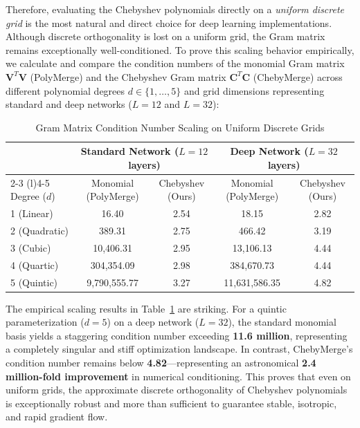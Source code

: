 \documentclass{article}
\theoremstyle{plain}
\theoremstyle{definition}
\theoremstyle{remark}
\begin{document}
Therefore, evaluating the Chebyshev polynomials directly on a \emph{uniform discrete grid} is the most natural and direct choice for deep learning implementations. Although discrete orthogonality is lost on a uniform grid, the Gram matrix remains exceptionally well-conditioned. To prove this scaling behavior empirically, we calculate and compare the condition numbers of the monomial Gram matrix $\mathbf{V}^T \mathbf{V}$ (PolyMerge) and the Chebyshev Gram matrix $\mathbf{C}^T \mathbf{C}$ (ChebyMerge) across different polynomial degrees $d \in \{1, \dots, 5\}$ and grid dimensions representing standard and deep networks ($L=12$ and $L=32$):

\begin{table}[h]
\caption{Gram Matrix Condition Number Scaling on Uniform Discrete Grids}
\label{tab:grid_scaling}
\vskip 0.15in
\begin{center}
\begin{small}
\begin{tabular}{lcccc}
\toprule
& \multicolumn{2}{c}{\textbf{Standard Network ($L=12$ layers)}} & \multicolumn{2}{c}{\textbf{Deep Network ($L=32$ layers)}} \\
\cmidrule(r){2-3} \cmidrule(l){4-5}
Degree ($d$) & Monomial (PolyMerge) & Chebyshev (Ours) & Monomial (PolyMerge) & Chebyshev (Ours) \\
\midrule
1 (Linear) & 16.40 & 2.54 & 18.15 & 2.82 \\
2 (Quadratic) & 389.31 & 2.75 & 466.42 & 3.19 \\
3 (Cubic) & 10,406.31 & 2.95 & 13,106.13 & 4.44 \\
4 (Quartic) & 304,354.09 & 2.98 & 384,670.73 & 4.44 \\
5 (Quintic) & 9,790,555.77 & 3.27 & 11,631,586.35 & 4.82 \\
\bottomrule
\end{tabular}
\end{small}
\end{center}
\vskip -0.1in
\end{table}

The empirical scaling results in Table~\ref{tab:grid_scaling} are striking. For a quintic parameterization ($d=5$) on a deep network ($L=32$), the standard monomial basis yields a staggering condition number exceeding \textbf{11.6 million}, representing a completely singular and stiff optimization landscape. In contrast, ChebyMerge's condition number remains below \textbf{4.82}---representing an astronomical \textbf{2.4 million-fold improvement} in numerical conditioning. This proves that even on uniform grids, the approximate discrete orthogonality of Chebyshev polynomials is exceptionally robust and more than sufficient to guarantee stable, isotropic, and rapid gradient flow.
\end{document}
